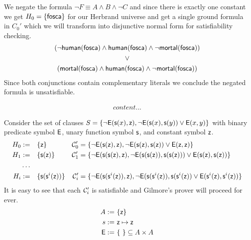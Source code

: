 

	We negate the formula $\lnot F \equiv A\land B \land\lnot C$ and since there is exactly one constant we get
	$H_0 = \{ \mathsf{fosca} \}$ for our Herbrand universe and get a single ground formula in $C_0'$
	which we will transform into 
	disjunctive normal form for satisfiability checking.
%
\begin{gather*}
(\lnot\mathsf{human}(\mathsf{fosca})\land\mathsf{human}(\mathsf{fosca})\land\lnot\mathsf{mortal}(\mathsf{fosca}))
\\ 
\lor
\\ 
(\mathsf{mortal}(\mathsf{fosca})\land\mathsf{human}(\mathsf{fosca})\land\lnot\mathsf{mortal}(\mathsf{fosca}))
\end{gather*}
Since both conjunctions contain complementary literals we conclude the negated formula is unsatisfiable.


\begin{gather*}
content...
\end{gather*}


\begin{example}
	Consider the set of clauses 
	$S = \{ 
	\lnot{\mathsf{E}}({\mathsf s}(x), {\mathsf z}), 
	\lnot {\mathsf{E}}({\mathsf s}(x), {\mathsf s}(y)) \lor {\mathsf{E}}(x,y)
	\}$ with binary predicate symbol ${\mathsf{E}}$, unary function symbol ${\mathsf s}$, and constant symbol ${\mathsf z}$.
	\begin{align*}
	H_0 :=&\quad \{ {\mathsf z} \} & {\mathcal C}_0' &= \{  
	\lnot{\mathsf{E}}({\mathsf s}({\mathsf z}), {\mathsf z}), 
	\lnot {\mathsf{E}}({\mathsf s}({\mathsf z}), {\mathsf s}({\mathsf z})) \lor {\mathsf{E}}({\mathsf z},{\mathsf z})
	\}
	\\
	H_1 :=&\quad \{ {\mathsf s}({\mathsf z}) \} & {\mathcal C}_1' &= \{ 
		\lnot{\mathsf{E}}({\mathsf s}({\mathsf s}({\mathsf z}), {\mathsf z}),
		\lnot {\mathsf{E}}({\mathsf s}({\mathsf s}({\mathsf z})), {\mathsf s}({\mathsf s}({\mathsf z}))) \lor {\mathsf{E}}({\mathsf s}({\mathsf z}),{\mathsf s}({\mathsf z}))
	 \}
	 \\\ldots
	 \\
	 H_i :=&\quad \{ 
	 {\mathsf s}({\mathsf s}^i({\mathsf z})) \} & {\mathcal C}_i' &= \{  
	 \lnot{\mathsf{E}}({\mathsf s}({\mathsf s}^i({\mathsf z})), {\mathsf z}), 
	 \lnot {\mathsf{E}}({\mathsf s}({\mathsf s}^i({\mathsf z})), {\mathsf s}({\mathsf s}^i({\mathsf z})) \lor {\mathsf{E}}({\mathsf s}^i({\mathsf z}),{\mathsf s}^i({\mathsf z}))
	 \}
	\end{align*} 
	It is easy to see that each ${\mathcal C}_i'$ is satisfiable and Gilmore's prover will proceed for ever.
	\begin{align*}
	A := &\ \{ {\mathsf z} \} \\
	s := &\ {\mathsf z}\mapsto{\mathsf z} \\
	{\mathsf{E}} := &\ \{\ \} \subseteq A\times A
	\end{align*}
\end{example}

